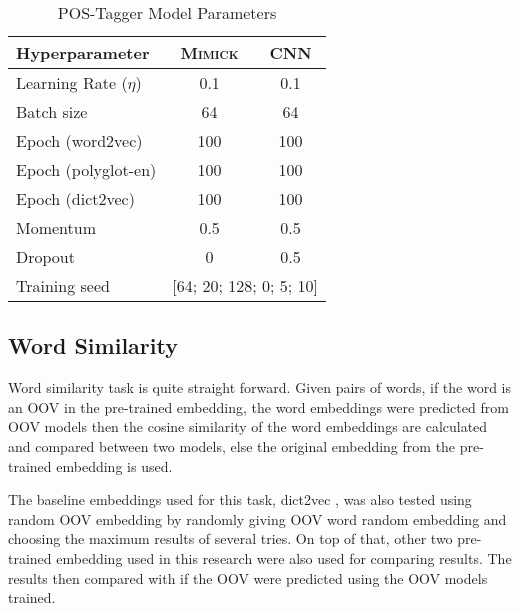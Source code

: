         \begin{table}[]
            \centering
            \caption{POS-Tagger Model Parameters}
            \label{tab:hyperparameterpostag}
            \begin{tabular}{@{}lcc@{}}
                \toprule
                \textbf{Hyperparameter} & \multicolumn{1}{c}{\textbf{\textsc{Mimick}}} & \multicolumn{1}{c}{\textbf{CNN}} \\ \midrule
                Learning Rate ($\eta$) & 0.1 & 0.1 \\
                Batch size & 64 & 64 \\
                Epoch (word2vec) & 100 & 100 \\
                Epoch (polyglot-en) & 100 & 100 \\
                Epoch (dict2vec) & 100 & 100 \\
                Momentum & 0.5 & 0.5 \\
                Dropout & 0 & 0.5 \\ 
                Training seed & \multicolumn{2}{c}{[64; 20; 128; 0; 5; 10]} \\
                \bottomrule
            \end{tabular}
        \end{table}

    \subsection{Word Similarity}
        Word similarity task is quite straight forward. Given pairs of
        words, if the word is an OOV in the pre-trained embedding, the
        word embeddings were predicted from OOV models then the cosine
        similarity of the word embeddings are calculated and compared
        between two models, else the original embedding from the
        pre-trained embedding is used. 
        
        The baseline embeddings used for this task, dict2vec
        \citep{dict2vect2017tissier}, was also tested using random OOV
        embedding by randomly giving OOV word random embedding and
        choosing the maximum results of several tries. On top of that,
        other two pre-trained embedding used in this research were
        also used for comparing results. The results then compared
        with if the OOV were predicted using the OOV models trained.
